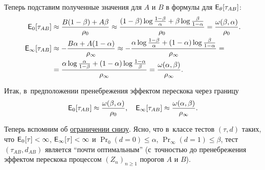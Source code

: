 Теперь подставим полученные значения для \(A\) и \(B\) в формулы для \(\E_{\theta}[\tau_{AB}]\):
\begin{align*}
	\E_{0}[\tau_{AB}] &\approx \frac{B(1 - \beta) + A\beta}{\rho_{0}} \approx \frac{(1 - \beta)\log\frac{1 - \beta}{\alpha} + \beta\log\frac{\beta}{1 - \alpha}}{\rho_{0}}
	= \frac{\omega(\beta,\alpha)}{\rho_{0}}. \\
	\E_{\infty}[\tau_{AB}] &\approx -\frac{B\alpha + A(1 - \alpha)}{\rho_{\infty}} \approx -\frac{\alpha\log\frac{1 - \beta}{\alpha}+(1 - \alpha)\log\frac{\beta}{1 - \alpha}}{\rho_{\infty}} = \\
	&= \frac{\alpha\log\frac{\alpha}{1 - \beta} + (1 - \alpha)\log\frac{1 - \alpha}{\beta}}{\rho_{\infty}} = \frac{\omega(\alpha,\beta)}{\rho_{\infty}}.
\end{align*}

Итак, в~предположении пренебрежения эффектом перескока через границу
\[
	\E_{0}[\tau_{AB}] \approx \frac{\omega(\beta,\alpha)}{\rho_{0}}, \quad \E_{\infty}[\tau_{AB}] \approx \frac{\omega(\alpha,\beta)}{\rho_{\infty}}.
\]

Теперь вспомним об \hyperref[lemma:tau-limitation]{ограничении снизу}. Ясно, что в~классе тестов \((\tau, d)\) таких, что \(\E_{0}[\tau] < \infty\), \(\E_{\infty}[\tau] < \infty\) и \(\Pr_{0}(d = 0) \leq \alpha\), \(\Pr_{\infty}(d = 1) \leq \beta\), тест \((\tau_{AB},d_{AB})\) является ``почти оптимальным'' (с~точностью до пренебрежения эффектом
перескока процессом \((Z_{n})_{n \geq 1}\) порогов \(A\) и \(B\)).

